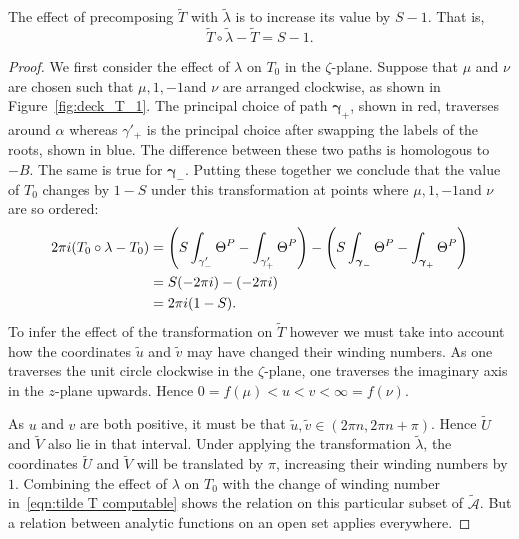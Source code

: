 \documentclass{article}
\begin{document}
\begin{lem}\label{lem:T shift}
The effect of precomposing $\tilde{T}$ with $\tilde{\lambda}$ is to increase its value by $S-1$. That is,
\[
\tilde{T} \circ \tilde{\lambda} - \tilde{T}
= S-1.
\]
\begin{proof}
We first consider the effect of $\lambda$ on $T_0$ in the $\zeta$-plane. Suppose that $\mu$ and $\nu$ are chosen such that $\mu,1,-1$and $\nu$ are arranged clockwise, as shown in Figure~\ref{fig:deck_T_1}. The principal choice of path $\boldsymbol{\gamma}_+$, shown in red, traverses around $\alpha$ whereas $\gamma'_+$ is the principal choice after swapping the labels of the roots, shown in blue.
The difference between these two paths is homologous to $-B$. 
The same is true for $\boldsymbol{\gamma}_-$.
Putting these together we conclude that the value of $T_0$ changes by $1-S$ under this transformation at points where $\mu,1,-1$and $\nu$ are so ordered:
\begin{align*}
2\pi i (T_0 \circ \lambda - T_0)
&= \left( S\int_{\gamma'_-} \Theta^P - \int_{\gamma'_+} \Theta^P \right) - \left( S\int_{\boldsymbol{\gamma}_-} \Theta^P - \int_{\boldsymbol{\gamma}_+} \Theta^P \right) \\
&= S(-2\pi i) - (-2\pi i) \\
&= 2\pi i (1-S).
\end{align*}
To infer the effect of the transformation on $\tilde{T}$ however we must take into account how the coordinates $\tilde{u}$ and $\tilde{v}$ may have changed their winding numbers. 
As one traverses the unit circle clockwise in the $\zeta$-plane, one traverses the imaginary axis in the $z$-plane upwards. 
Hence $0 = f(\mu) < u < v < \infty = f(\nu)$.

As $u$ and $v$ are both positive, it must be that $\tilde{u},\tilde{v} \in (2\pi n, 2\pi n + \pi)$. Hence $\tilde{U}$ and $\tilde{V}$ also lie in that interval. Under applying the transformation $\tilde{\lambda}$, the coordinates $\tilde{U}$ and $\tilde{V}$ will be translated by $\pi$, increasing their winding numbers by $1$. Combining the effect of $\lambda$ on $T_0$ with the change of winding number in~\eqref{eqn:tilde T computable} shows the relation on this particular subset of $\mathcal{\tilde{A}}$. But a relation between analytic functions on an open set applies everywhere.
\end{proof}
\end{lem}
\end{document}
